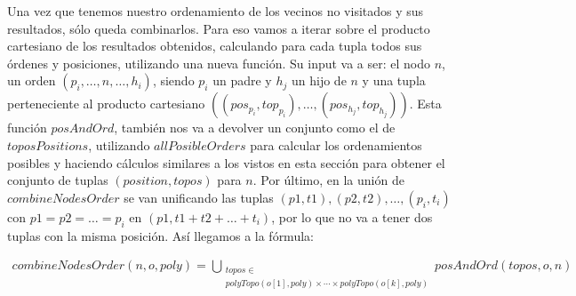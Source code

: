 Una vez que tenemos nuestro ordenamiento de los vecinos no visitados y sus resultados, sólo queda combinarlos. Para eso vamos a iterar sobre el producto cartesiano de los resultados obtenidos, calculando para cada tupla todos sus órdenes y posiciones, utilizando una nueva función. Su input va a ser: el nodo $n$, un orden $(p_i, \dots, n , \dots, h_i)$, siendo $p_i$ un padre y $h_j$ un hijo de $n$ y una tupla perteneciente al producto cartesiano $((pos_{p_i}, top_{p_i}), \dots , (pos_{h_j}, top_{h_j}))$. Esta función $posAndOrd$, también nos va a devolver un conjunto como el de $toposPositions$, utilizando $allPosibleOrders$ para calcular los ordenamientos posibles y haciendo cálculos similares a los vistos en esta sección para obtener el conjunto de tuplas $(position, topos)$ para $n$. Por último, en la unión de $combineNodesOrder$ se van unificando las tuplas $(p1, t1), (p2,t2), \dots ,(p_i,t_i)$ con $p1=p2=\dots=p_i$ en $(p1, t1+t2+\dots+t_i)$, por lo que no va a tener dos tuplas con la misma posición. Así llegamos a la fórmula: 

\begin{align}
\label{formula:combineNeighboursInOrder} 
combineNodesOrder(n, o, poly) = 
\bigcup_{\substack{
    topos \in \\
    polyTopo(o[1], poly) \times \cdots \times polyTopo(o[k], poly)
}} 
posAndOrd(topos, o, n)
\end{align}


